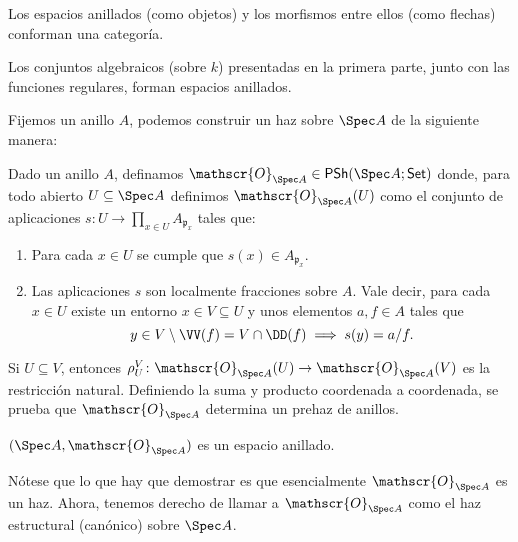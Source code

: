\begin{prop}
	Los espacios anillados (como objetos) y los morfismos entre ellos (como flechas) conforman una categoría.
\end{prop}
\begin{ex}
	Los conjuntos algebraicos (sobre $k$) presentadas en la primera parte, junto con las funciones regulares, forman espacios anillados.
\end{ex}
Fijemos un anillo $A$, podemos construir un haz sobre $\Spec A$ de la siguiente manera:
\begin{mydef}
	Dado un anillo $A$, definamos $\mathscr{O}_{\Spec A} \in \mathsf{PSh}(\Spec A; \mathsf{Set})$ donde,
	para todo abierto $U \subseteq \Spec A$ definimos $\mathscr{O}_{\Spec A}(U )$ como el conjunto de aplicaciones $s \colon U \to
	\prod_{x\in U} A_{\mathfrak{p}_x}$ tales que:
	\begin{enumerate}[{HE}1.]
		\item Para cada $x \in U$ se cumple que $s(x) \in A_{\mathfrak{p}_x}$.
		\item Las aplicaciones $s$ son localmente fracciones sobre $A$.
			Vale decir, para cada $x \in U$ existe un entorno $x \in V \subseteq U$ y unos elementos $a, f \in A$ tales que
			$$ y \in V \setminus \VV(f ) = V \cap \DD(f ) \implies s(y) = a/f. $$
	\end{enumerate}
	Si $U \subseteq V$, entonces $\rho^V_U \colon \mathscr{O}_{\Spec A}(U ) \to \mathscr{O}_{\Spec A}(V)$ es la restricción natural.
	Definiendo la suma y producto coordenada a coordenada, se prueba que $\mathscr{O}_{\Spec A}$ determina un prehaz de anillos.
\end{mydef}
\begin{prop}
	$(\Spec A, \mathscr{O}_{\Spec A})$ es un espacio anillado.
\end{prop}
Nótese que lo que hay que demostrar es que esencialmente $\mathscr{O}_{\Spec A}$ es un haz.
Ahora, tenemos derecho de llamar a $\mathscr{O}_{\Spec A}$  como el haz estructural (canónico) sobre $\Spec A$.

